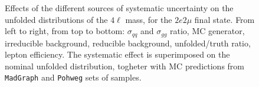 \begin{figure}[hbtp]
\begin{center}
    \caption{Effects of the different sources of systematic uncertainty on the unfolded distributions of the $4\ell$ mass, for the     
    $2e2\mu$ final state. From left to right, from top to bottom: $\sigma_{qq}$ and $\sigma_{gg}$ ratio, MC generator, irreducible background,
reducible background, unfolded/truth ratio, lepton efficiency. The systematic effect is superimposed on the nominal unfolded distribution, togheter with MC predictions from \texttt{MadGraph} and \texttt{Pohweg} sets of samples.}
    \label{fig:Mass_syst_2e2m}
  \end{center}
\end{figure}
\clearpage
